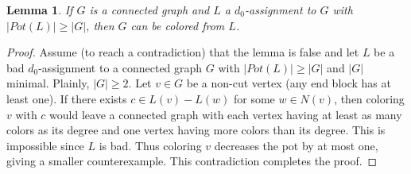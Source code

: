 \documentclass[12pt]{article}
\theoremstyle{plain}
\newtheorem{lem}[thm]{Lemma}
\theoremstyle{definition}
\theoremstyle{remark}
\begin{document}
\begin{lem}\label{d0PotColoring}
If $G$ is a connected graph and $L$ a $d_0$-assignment to $G$ with $|Pot(L)| \geq |G|$, then $G$ can be colored from $L$.
\end{lem}
\begin{proof}
Assume (to reach a contradiction) that the lemma is false and let $L$ be a bad $d_0$-assignment to a connected graph
 $G$ with $|Pot(L)| \geq |G|$ and $|G|$ minimal.  Plainly, $|G| \geq 2$.  
Let $v \in G$ be a non-cut vertex (any end block has at least one).  
If there exists $c \in L(v)- L(w)$ for some $w \in N(v)$, then coloring $v$ with $c$ would leave a connected graph with each
vertex having at least as many colors as its degree and one vertex having more colors than its degree.  This is impossible since
$L$ is bad.  Thus coloring $v$ decreases the pot by at most one, giving a smaller counterexample.  This contradiction completes the proof.
\end{proof}
\end{document}
